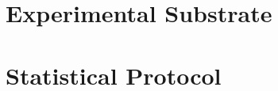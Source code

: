 \section{Experimental Substrate}
\label{sec:meth-substrate}

\section{Statistical Protocol}
\label{sec:meth-protocol}
